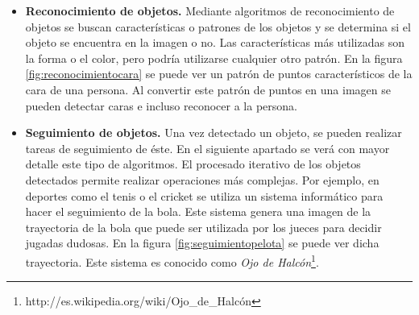 \begin{itemize}

\item \textbf{Reconocimiento de objetos.} Mediante algoritmos de reconocimiento de objetos se buscan características o patrones de los objetos y se determina si el objeto se encuentra en la imagen o no. Las características más utilizadas son la forma o el color, pero podría utilizarse cualquier otro patrón. En la figura \ref{fig:reconocimientocara} se puede ver un patrón de puntos característicos de la cara de una persona. Al convertir este patrón de puntos en una imagen se pueden detectar caras e incluso reconocer a la persona. 

\item \textbf{Seguimiento de objetos.} Una vez detectado un objeto, se pueden realizar tareas de seguimiento de éste. En el siguiente apartado se verá con mayor detalle este tipo de algoritmos. El procesado iterativo de los objetos detectados permite realizar operaciones más complejas. Por ejemplo, en deportes como el tenis o el cricket se utiliza un sistema informático para hacer el seguimiento de la bola. Este sistema genera una imagen de la trayectoria de la bola que puede ser utilizada  por los jueces para decidir jugadas dudosas. En la figura \ref{fig:seguimientopelota} se puede ver dicha trayectoria. Este sistema es conocido como \textit{Ojo de Halcón}\footnote{http://es.wikipedia.org/wiki/Ojo\_de\_Halcón}.

\end{itemize}

